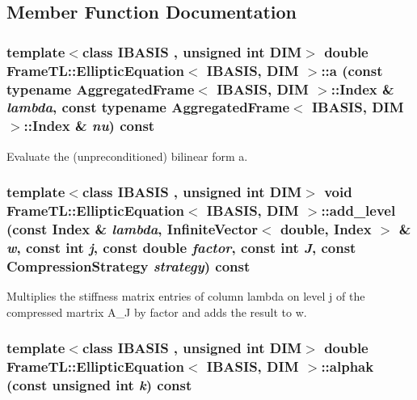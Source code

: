 \subsection{Member Function Documentation}
\hypertarget{classFrameTL_1_1EllipticEquation_b0b18bd3a6a0f43c5ed302a2fc80c235}{
\subsubsection[{a}]{\setlength{\rightskip}{0pt plus 5cm}template$<$class IBASIS , unsigned int DIM$>$ double {\bf FrameTL::EllipticEquation}$<$ IBASIS, DIM $>$::a (const typename {\bf AggregatedFrame}$<$ IBASIS, DIM $>$::{\bf Index} \& {\em lambda}, \/  const typename {\bf AggregatedFrame}$<$ IBASIS, DIM $>$::{\bf Index} \& {\em nu}) const}}
\label{classFrameTL_1_1EllipticEquation_b0b18bd3a6a0f43c5ed302a2fc80c235}


Evaluate the (unpreconditioned) bilinear form a. \hypertarget{classFrameTL_1_1EllipticEquation_79b1544139e7bb5672f1af5c84a238bc}{
\subsubsection[{add\_\-level}]{\setlength{\rightskip}{0pt plus 5cm}template$<$class IBASIS , unsigned int DIM$>$ void {\bf FrameTL::EllipticEquation}$<$ IBASIS, DIM $>$::add\_\-level (const {\bf Index} \& {\em lambda}, \/  InfiniteVector$<$ double, {\bf Index} $>$ \& {\em w}, \/  const int {\em j}, \/  const double {\em factor}, \/  const int {\em J}, \/  const CompressionStrategy {\em strategy}) const}}
\label{classFrameTL_1_1EllipticEquation_79b1544139e7bb5672f1af5c84a238bc}


Multiplies the stiffness matrix entries of column lambda on level j of the compressed martrix A\_\-J by factor and adds the result to w. \hypertarget{classFrameTL_1_1EllipticEquation_0ec35809bbfccc2dfff23d6efbee6a92}{
\subsubsection[{alphak}]{\setlength{\rightskip}{0pt plus 5cm}template$<$class IBASIS , unsigned int DIM$>$ double {\bf FrameTL::EllipticEquation}$<$ IBASIS, DIM $>$::alphak (const unsigned int {\em k}) const}}
\label{classFrameTL_1_1EllipticEquation_0ec35809bbfccc2dfff23d6efbee6a92}


